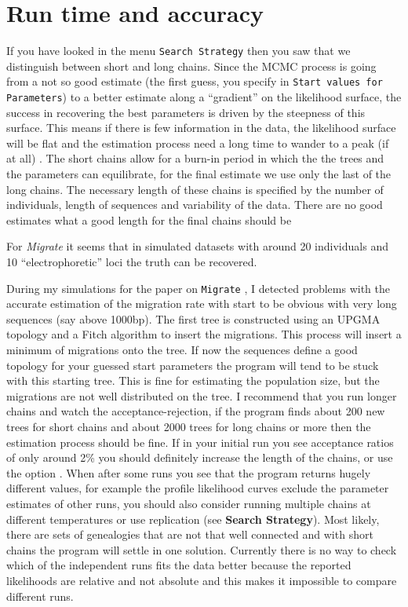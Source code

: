 \section{Run time and accuracy}
If you have looked in the menu {\tt Search Strategy} then you saw that
we distinguish between short and long chains. Since the MCMC process
is going from a not so good estimate (the first guess, you specify in
{\tt Start values for Parameters}) to a better estimate along a
``gradient'' on the likelihood surface, the success in recovering the
best parameters is driven by the steepness of this surface. This means
if there is few information in the data, the likelihood surface will
be flat and the estimation process need a long time to wander to a
peak (if at all) . The short chains allow for a burn-in period in
which the the trees and the parameters can equilibrate, for the final
estimate we use only the last of the long chains. The necessary length
of these chains is specified by the number of individuals, length of
sequences and variability of the data. There are no good estimates
what a good length for the final chains should be
\par
For {\it Migrate} it seems that in simulated datasets with around 20
individuals and 10 ``electrophoretic'' loci the truth can be
recovered.
\par
During my simulations for the paper on {\tt Migrate} \citep{Beerli:1999:MLE}, I detected problems 
with the accurate estimation of the migration rate with
start to be obvious with very long sequences (say above 1000bp). 
The first tree is constructed using an UPGMA topology and a Fitch algorithm to 
insert the migrations. This process will insert a minimum of migrations 
onto the tree.
If now the sequences define a good topology for your guessed start 
parameters the program will tend to be stuck with this starting tree.  This is
fine for estimating the population size, but the migrations are not 
well distributed on the tree. 
I recommend that you run longer chains and watch the 
acceptance-rejection, if the program finds about 200 new trees for short chains and about 2000 trees for long chains or more  then the estimation process should be fine.
If in your initial run you see acceptance ratios of only around 2\% you should 
definitely increase the length of the chains, or use the option {}. 
When after some runs
you see that the program returns hugely different values, for example
the profile likelihood curves exclude the parameter estimates of other
runs, you should also consider running multiple chains 
at different temperatures or use replication (see {\bf Search Strategy}).
Most likely, there are
sets of genealogies that are not that well connected and with short
chains the program will settle in one solution. 
Currently there is no way to check
which of the independent runs fits the data better because the 
reported likelihoods are relative and not absolute and this makes 
it impossible to compare different runs. 


